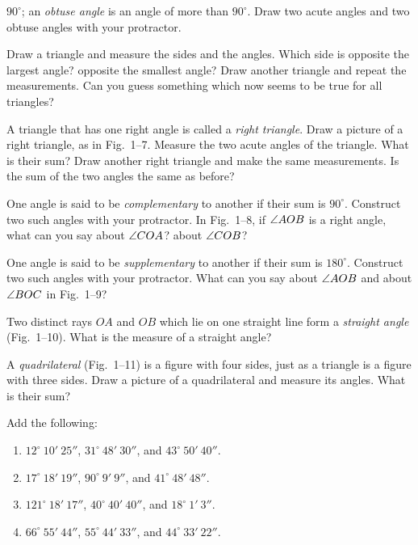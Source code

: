 \documentclass[11pt]{book}
\begin{document}
\begin{exercisecols}
\begin{exlist}
      $90^\circ$; an \emph{obtuse angle} is an angle of more than $90^\circ$.
      Draw two acute angles and two obtuse angles with your protractor.
\exfig{\FIGISIX}
\item Draw a triangle and measure the sides and the angles. Which side is
      opposite the largest angle? opposite the smallest angle? Draw another
      triangle and repeat the measurements. Can you guess something which now
      seems to be true for all triangles?
\item A triangle that has one right angle is called a \emph{right triangle}. Draw
      a picture of a right triangle, as in Fig.~1--7. Measure the two acute
      angles of the triangle. What is their sum? Draw another right triangle and
      make the same measurements. Is the sum of the two angles the same as
      before?
\exfig{\FIGISEVEN}
\item One angle is said to be \emph{complementary} to another if their sum is
      $90^\circ$. Construct two such angles with your protractor. In Fig.~1--8,
      if $\angle AOB$ is a right angle, what can you say about $\angle COA$? about
      $\angle COB$?
\exfig{\FIGIEIGHT}
\item One angle is said to be \emph{supplementary} to another if their sum is
      $180^\circ$. Construct two such angles with your protractor. What can you
      say about $\angle AOB$ and about $\angle BOC$ in Fig.~1--9?
\exfig{\FIGININE}
\item Two distinct rays $OA$ and $OB$ which lie on one straight line form a
      \emph{straight angle} (Fig.~1--10). What is the measure of a straight
      angle?
\exfig{\FIGITEN}
\item A \emph{quadrilateral} (Fig.~1--11) is a figure with four sides, just as a
      triangle is a figure with three sides. Draw a picture of a quadrilateral and
      measure its angles. What is their sum?
\exfig{\FIGIELEVEN}
\item Add the following:
  \begin{enumerate}[label=(\alph*), leftmargin=1.9em, itemsep=1pt, topsep=2pt]
  \item $12^\circ\ 10'\ 25''$, $31^\circ\ 48'\ 30''$, and $43^\circ\ 50'\ 40''$.
  \item $17^\circ\ 18'\ 19''$, $90^\circ\ 9'\ 9''$, and $41^\circ\ 48'\ 48''$.
  \item $121^\circ\ 18'\ 17''$, $40^\circ\ 40'\ 40''$, and $18^\circ\ 1'\ 3''$.
  \item $66^\circ\ 55'\ 44''$, $55^\circ\ 44'\ 33''$, and $44^\circ\ 33'\ 22''$.

\end{enumerate}
\end{exlist}
\end{exercisecols}
\end{document}
